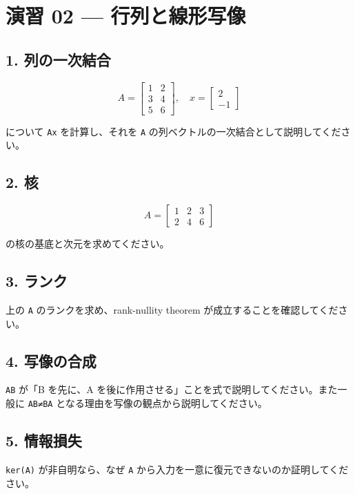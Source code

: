 \documentclass[
  11pt,
  a4paper,
]{ltjsarticle}
\author{}
\date{}
\begin{document}
\hypertarget{ux6f14ux7fd2-02-ux884cux5217ux3068ux7ddaux5f62ux5199ux50cf}{%
\section{演習 02 ---
行列と線形写像}\label{ux6f14ux7fd2-02-ux884cux5217ux3068ux7ddaux5f62ux5199ux50cf}}

\hypertarget{ux5217ux306eux4e00ux6b21ux7d50ux5408}{%
\subsection{1.
列の一次結合}\label{ux5217ux306eux4e00ux6b21ux7d50ux5408}}

\[
A=\begin{bmatrix}1&2\\3&4\\5&6\end{bmatrix},\quad x=\begin{bmatrix}2\\-1\end{bmatrix}
\]

について \texttt{Ax} を計算し、それを \texttt{A}
の列ベクトルの一次結合として説明してください。

\hypertarget{ux6838}{%
\subsection{2. 核}\label{ux6838}}

\[
A=\begin{bmatrix}1&2&3\\2&4&6\end{bmatrix}
\]

の核の基底と次元を求めてください。

\hypertarget{ux30e9ux30f3ux30af}{%
\subsection{3. ランク}\label{ux30e9ux30f3ux30af}}

上の \texttt{A} のランクを求め、rank-nullity theorem
が成立することを確認してください。

\hypertarget{ux5199ux50cfux306eux5408ux6210}{%
\subsection{4. 写像の合成}\label{ux5199ux50cfux306eux5408ux6210}}

\texttt{AB} が「B を先に、A
を後に作用させる」ことを式で説明してください。また一般に \texttt{AB≠BA}
となる理由を写像の観点から説明してください。

\hypertarget{ux60c5ux5831ux640dux5931}{%
\subsection{5. 情報損失}\label{ux60c5ux5831ux640dux5931}}

\texttt{ker(A)} が非自明なら、なぜ \texttt{A}
から入力を一意に復元できないのか証明してください。
\end{document}
